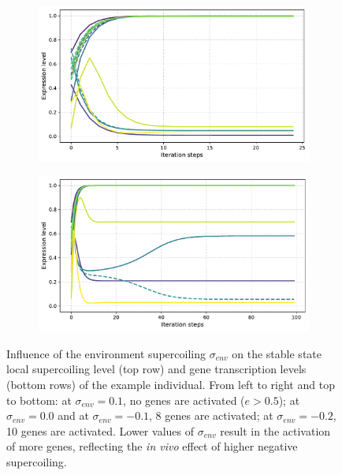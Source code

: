 \begin{figure}[H]
  \begin{subfigure}[t]{0.48\textwidth}
    \includegraphics[width=\textwidth]{alife/img/13genes_sigma_1.pdf}
    \label{subfig:alife:sigma_1}
  \end{subfigure}
  \begin{subfigure}[t]{0.48\textwidth}
    \includegraphics[width=\textwidth]{alife/img/13genes_sigma_0.pdf}
    \label{subfig:alife:sigma_0}
  \end{subfigure}
  \caption[Influence of environmental supercoiling on the phenotype of the example individual in Figure~\ref{fig:alife:13genes}]{Influence of the environment supercoiling $\sigma_{env}$ on the stable state local supercoiling level (top row) and gene transcription levels (bottom rows) of the example individual.
  From left to right and top to bottom: at $\sigma_{env} = 0.1$, no genes are activated ($e > 0.5$); at $\sigma_{env} = 0.0$ and at $\sigma_{env} = -0.1$, 8 genes are activated; at $\sigma_{env} = -0.2$, 10 genes are activated.
  Lower values of $\sigma_{env}$ result in the activation of more genes, reflecting the \emph{in vivo} effect of higher negative supercoiling.}
  \label{fig:alife:sigma_env}
\end{figure}

